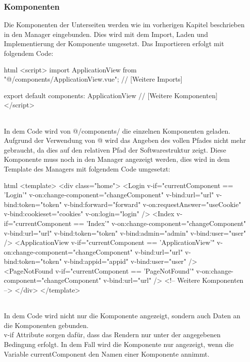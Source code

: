 \subsubsection{Komponenten}
Die Komponenten der Unterseiten werden wie im vorherigen Kapitel beschrieben in den Manager eingebunden. Dies wird mit dem Import, Laden und Implementierung der Komponente umgesetzt.
Das Importieren erfolgt mit folgendem Code:
\begin{code}{html}
	<script>
	import ApplicationView from "@/components/ApplicationView.vue";
	// [Weitere Imports]
	
	export default {
		components: {
			ApplicationView
			// [Weitere Komponenten]
		}
	}
</script>
\end{code}
~\\
In dem Code wird von @/components/ die einzelnen Komponenten geladen. Aufgrund der Verwendung von @ wird das Angeben des vollen Pfades nicht mehr gebraucht, da dies auf den relativen Pfad der Softwarestruktur zeigt.
\newpage
Diese Komponente muss noch in den Manager angezeigt werden, dies wird in dem Template des Managers mit folgendem Code umgesetzt:
\begin{code}{html}
<template>
	<div class="home">
		<Login
			v-if="currentComponent == 'Login'"
			v-on:change-component="changeComponent"
			v-bind:url="url"
			v-bind:token="token"
			v-bind:forward="forward"
			v-on:requestAnswer="useCookie"
			v-bind:cookieset="cookies"
			v-on:login="login"
		/>
		<Index
			v-if="currentComponent == 'Index'"
			v-on:change-component="changeComponent"
			v-bind:url="url"
			v-bind:token="token"
			v-bind:admin="admin"
			v-bind:user="user"
		/>
		<ApplicationView
			v-if="currentComponent == 'ApplicationView'"
			v-on:change-component="changeComponent"
			v-bind:url="url"
			v-bind:token="token"
			v-bind:appid="appid"
			v-bind:user="user"
		/>
		<PageNotFound
			v-if="currentComponent == 'PageNotFound'"
			v-on:change-component="changeComponent"
			v-bind:url="url"
		/>
		<!-- Weitere Komponenten -->
	</div>
</template>
\end{code}
~\\
In dem Code wird nicht nur die Komponente angezeigt, sondern auch Daten an die Komponenten gebunden.\\
v-if Attribute sorgen dafür, dass das Rendern nur unter der angegebenen Bedingung erfolgt. In dem Fall wird die Komponente nur angezeigt, wenn die Variable currentComponent den Namen einer Komponente annimmt.\\
